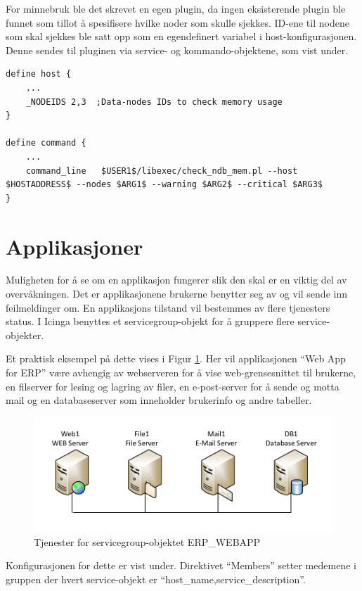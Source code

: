 For minnebruk ble det skrevet en egen plugin, da ingen eksisterende plugin ble funnet som tillot å spesifisere hvilke noder som skulle sjekkes. ID-ene til nodene som skal sjekkes ble satt opp som en egendefinert variabel i host-konfigurasjonen. Denne sendes til pluginen via service- og kommando-objektene, som vist under.

\begin{lstlisting}
define host {
	...
	_NODEIDS 2,3  ;Data-nodes IDs to check memory usage
}

define command {
	...
	command_line   $USER1$/libexec/check_ndb_mem.pl --host $HOSTADDRESS$ --nodes $ARG1$ --warning $ARG2$ --critical $ARG3$
}
\end{lstlisting}
\section{Applikasjoner}
Muligheten for å se om en applikasjon fungerer slik den skal er en viktig del av overvåkningen. Det er applikasjonene brukerne benytter seg av og vil sende inn feilmeldinger om. En applikasjons tilstand vil bestemmes av flere tjenesters status. I Icinga benyttes et servicegroup-objekt for å gruppere flere service-objekter.

Et praktisk eksempel på dette vises i Figur \ref{servicegroup_layout}. Her vil applikasjonen “Web App for ERP” være avhengig av webserveren for å vise web-grensesnittet til brukerne, en filserver for lesing og lagring av filer, en e-post-server for å sende og motta mail og en databaseserver som inneholder brukerinfo og andre tabeller. 

\begin{figure}[H]
    \centering
    \includegraphics[scale=0.6]{img/servicegroup_layout}
    \caption{Tjenester for servicegroup-objektet  ERP\_WEBAPP}
    \label{servicegroup_layout}
\end{figure}


Konfigurasjonen for dette er vist under. Direktivet “Members” setter medemene i gruppen der hvert service-objekt er “host\_name,service\_description”.

